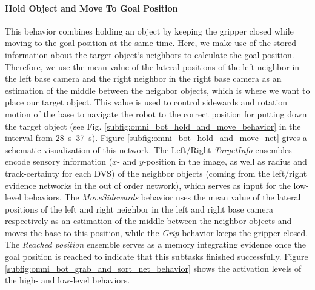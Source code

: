 \paragraph{Hold Object and Move To Goal Position} 
\label{holdmoveside}
This behavior combines holding an object by keeping the gripper closed while moving to the goal position at the same time. 
Here, we make use of the stored information about the target object`s neighbors to calculate the goal position. 
Therefore, we use the mean value of the lateral positions of the left neighbor in the left base camera and the right neighbor in the right base camera as an estimation of the middle between the neighbor objects, which is where we want to place our target object. 
This value is used to control sidewards and rotation motion of the base to navigate the robot to the correct position for putting down the target object (see Fig. \ref{subfig:omni_bot_hold_and_move_behavior} in the interval from \SIrange{28}{37}{\second}). 
Figure \ref{subfig:omni_bot_hold_and_move_net} gives a schematic visualization of this network. 
The Left/Right \emph{TargetInfo} ensembles encode sensory information ($x$- and $y$-position in the image, as well as radius and track-certainty for each \ac{DVS}) of the neighbor objects (coming from the left/right evidence networks in the out of order network), which serves as input for the low-level behaviors.
The \emph{MoveSidewards} behavior uses the mean value of the lateral positions of the left and right neighbor in the left and right base camera respectively as an estimation of the middle between the neighbor objects and moves the base to this position, while the \emph{Grip} behavior keeps the gripper closed.
The \emph{Reached position} ensemble serves as a memory integrating evidence once the goal position is reached to indicate that this subtasks finished successfully.
Figure \ref{subfig:omni_bot_grab_and_sort_net_behavior} shows the activation levels of the high- and low-level behaviors.

